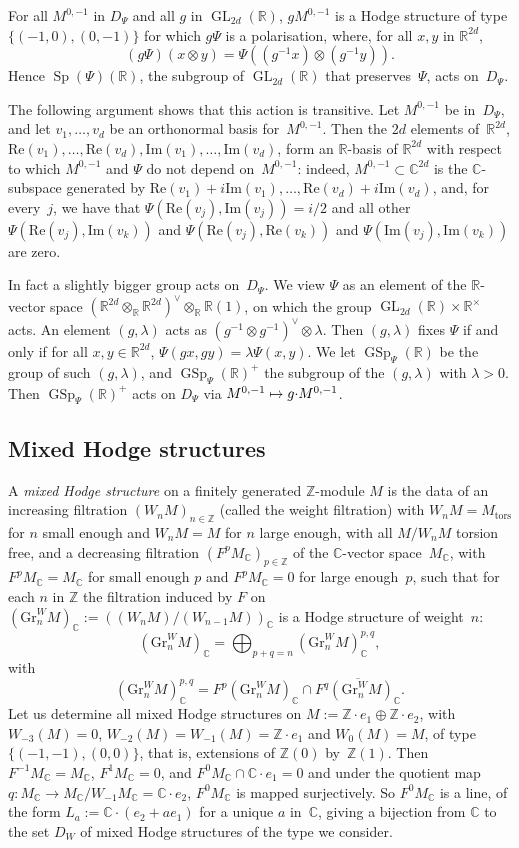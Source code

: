 \documentclass[JEP,XML,SOM,Unicode,NoFloatCountersInSection]{cedram}
\def\mto{\mathchoice{\longmapsto}{\mapsto}{\mapsto}{\mapsto}}
\let\oldvee\vee
\renewcommand{\vee}{{\scriptscriptstyle\oldvee}}
\theoremstyle{plain}
\theoremstyle{definition}
\numberwithin{equation}{subsection}
\let\ol\overline
\renewcommand{\C}{\mathbb C}
\newcommand{\R}{\mathbb R}
\newcommand{\Z}{\mathbb Z}
\newcommand{\Gr}{\mathrm{Gr}}
\newcommand{\tors}{\mathrm{tors}}
\renewcommand{\Im}{\mathrm{Im}}
\renewcommand{\Re}{\mathrm{Re}}
\DeclareMathOperator{\GL}{GL}
\DeclareMathOperator{\GSp}{GSp}
\DeclareMathOperator{\Sp}{Sp}
\begin{document}
For all $M^{0,-1}$ in $D_\Psi$ and all $g$ in $\GL_{2d}(\R)$,
$gM^{0,-1}$ is a Hodge structure of type $\{(-1,0),(0,-1)\}$ for which
$g\Psi$ is a polarisation, where, for all $x,y$ in $\R^{2d}$,
\[
(g\Psi)(x\otimes y) = \Psi((g^{-1}x)\otimes(g^{-1}y)).
\]
Hence
$\Sp(\Psi)(\R)$, the subgroup of $\GL_{2d}(\R)$ that preserves~$\Psi$,
acts on~$D_\Psi$.

The following argument shows that this action is transitive. Let
$M^{0,-1}$ be in~$D_\Psi$, and let $v_1,\ldots,v_d$ be an orthonormal
basis for~$M^{0,-1}$. Then the $2d$ elements of~$\R^{2d}$,
$\Re(v_1),\ldots,\Re(v_d),\Im(v_1),\ldots,\Im(v_d)$, form an $\R$-basis
of $\R^{2d}$ with respect to which $M^{0,-1}$ and $\Psi$ do not depend
on~$M^{0,-1}$: indeed, $M^{0,-1}\subset\C^{2d}$ is the $\C$-subspace
generated by
$\Re(v_1)+i\Im(v_1),\ldots, \Re(v_d)+i\Im(v_d)$, and, for every~$j$, we have
that $\Psi(\Re(v_j),\Im(v_j))=i/2$ and all other $\Psi(\Re(v_j),\Im(v_k))$
and $\Psi(\Re(v_j),\Re(v_k))$ and $\Psi(\Im(v_j),\Im(v_k))$ are zero.

In fact a slightly bigger group acts on~$D_\Psi$. We view $\Psi$ as
an element of the $\R$-vector space
$(\R^{2d}\otimes_\R\R^{2d})^\vee\otimes_\R\R(1)$, on which the group
$\GL_{2d}(\R)\times\R^\times$ acts. An element $(g,\lambda)$ acts as
$(g^{-1}\otimes g^{-1})^\vee\otimes \lambda$. Then $(g,\lambda)$ fixes
$\Psi$ if and only if for all $x,y\in\R^{2d}$,
$\Psi(gx,gy)=\lambda\Psi(x,y)$. We let $\GSp_\Psi(\R)$ be the group of
such $(g,\lambda)$, and $\GSp_\Psi(\R)^+$ the subgroup of the
$(g,\lambda)$ with $\lambda>0$. Then $\GSp_\Psi(\R)^+$ acts on $D_\Psi$
via $M^{0,-1}\mto g{\cdot}M^{0,-1}$.

\subsection{Mixed Hodge structures}
\label{sec:mhs}
A \emph{mixed Hodge structure} on a finitely generated $\Z$-module $M$
is the data of an increasing filtration $(W_nM)_{n\in\Z}$ (called the
weight filtration) with $W_nM=M_\tors$ for $n$ small enough and
$W_nM=M$ for $n$ large enough, with all $M/W_nM$ torsion free, and a
decreasing filtration $(F^pM_\C)_{p\in\Z}$ of the $\C$-vector space~$M_\C$, with $F^pM_\C=M_\C$ for small enough $p$ and $F^pM_\C=0$ for
large enough~$p$, such that for each $n$ in $\Z$ the filtration
induced by $F$ on $(\Gr^W_nM)_\C:=((W_nM)/(W_{n-1}M))_\C$ is a Hodge
structure of weight~$n$:
\[
(\Gr^W_nM)_\C = \bigoplus_{p+q=n} (\Gr^W_nM)^{p,q}_\C,
\]
with
\[
(\Gr^W_nM)^{p,q}_\C = F^p(\Gr^W_nM)_\C\cap \ol{F^q (\Gr^W_nM)_\C}.
\]
Let us determine all mixed Hodge structures on
$M:=\Z{\cdot}e_1\oplus\Z{\cdot}e_2$, with $W_{-3}(M)=0$,
$W_{-2}(M)=W_{-1}(M)=\Z{\cdot}e_1$ and $W_0(M)=M$, of type
$\{(-1,-1),(0,0)\}$, that is, extensions of $\Z(0)$ by~$\Z(1)$. Then
$F^{-1}M_\C=M_\C$, $F^1M_\C=0$, and $F^0M_\C\cap\C{\cdot}e_1=0$ and
under the quotient map $q\colon M_\C\to M_\C/W_{-1}M_\C=\C{\cdot}e_2$,
$F^0M_\C$ is mapped surjectively. So $F^0M_\C$ is a line, of the form
$L_a:=\C{\cdot}(e_2+ae_1)$ for a unique $a$ in~$\C$, giving a
bijection from $\C$ to the set $D_W$ of mixed Hodge structures of the
type we consider.
\end{document}

